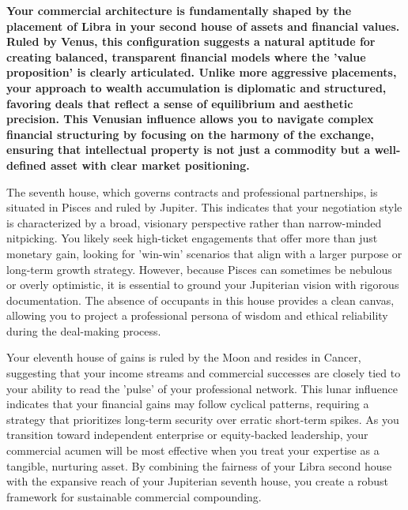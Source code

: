 {\fontsize{9.5}{13.8}\selectfont\bfseries\color{DeepSlate} Your commercial architecture is fundamentally shaped by the placement of Libra in your second house of assets and financial values. Ruled by Venus, this configuration suggests a natural aptitude for creating balanced, transparent financial models where the 'value proposition' is clearly articulated. Unlike more aggressive placements, your approach to wealth accumulation is diplomatic and structured, favoring deals that reflect a sense of equilibrium and aesthetic precision. This Venusian influence allows you to navigate complex financial structuring by focusing on the harmony of the exchange, ensuring that intellectual property is not just a commodity but a well-defined asset with clear market positioning.}\par\vspace{2mm}

{\fontsize{9}{13}\selectfont The seventh house, which governs contracts and professional partnerships, is situated in Pisces and ruled by Jupiter. This indicates that your negotiation style is characterized by a broad, visionary perspective rather than narrow-minded nitpicking. You likely seek high-ticket engagements that offer more than just monetary gain, looking for 'win-win' scenarios that align with a larger purpose or long-term growth strategy. However, because Pisces can sometimes be nebulous or overly optimistic, it is essential to ground your Jupiterian vision with rigorous documentation. The absence of occupants in this house provides a clean canvas, allowing you to project a professional persona of wisdom and ethical reliability during the deal-making process.}\par\vspace{1.8mm}

{\fontsize{9}{13}\selectfont Your eleventh house of gains is ruled by the Moon and resides in Cancer, suggesting that your income streams and commercial successes are closely tied to your ability to read the 'pulse' of your professional network. This lunar influence indicates that your financial gains may follow cyclical patterns, requiring a strategy that prioritizes long-term security over erratic short-term spikes. As you transition toward independent enterprise or equity-backed leadership, your commercial acumen will be most effective when you treat your expertise as a tangible, nurturing asset. By combining the fairness of your Libra second house with the expansive reach of your Jupiterian seventh house, you create a robust framework for sustainable commercial compounding.}\par\vspace{1.8mm}

